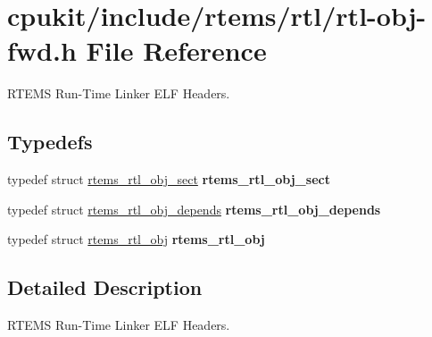 \hypertarget{rtl-obj-fwd_8h}{}\section{cpukit/include/rtems/rtl/rtl-\/obj-\/fwd.h File Reference}
\label{rtl-obj-fwd_8h}


R\+T\+E\+MS Run-\/\+Time Linker E\+LF Headers.  


\subsection*{Typedefs}
\begin{DoxyCompactItemize}
\item 
\mbox{\label{rtl-obj-fwd_8h_a22eec58ce830fd4de56f0a8e27e3bf7e}} 
typedef struct \mbox{\hyperlink{structrtems__rtl__obj__sect}{rtems\+\_\+rtl\+\_\+obj\+\_\+sect}} {\bfseries rtems\+\_\+rtl\+\_\+obj\+\_\+sect}
\item 
\mbox{\label{rtl-obj-fwd_8h_a4e08ba2466b93c09e5d8a94d87acee67}} 
typedef struct \mbox{\hyperlink{structrtems__rtl__obj__depends}{rtems\+\_\+rtl\+\_\+obj\+\_\+depends}} {\bfseries rtems\+\_\+rtl\+\_\+obj\+\_\+depends}
\item 
\mbox{\label{rtl-obj-fwd_8h_a97b620edca286b8d1dc5bb178016f7d5}} 
typedef struct \mbox{\hyperlink{structrtems__rtl__obj}{rtems\+\_\+rtl\+\_\+obj}} {\bfseries rtems\+\_\+rtl\+\_\+obj}
\end{DoxyCompactItemize}


\subsection{Detailed Description}
R\+T\+E\+MS Run-\/\+Time Linker E\+LF Headers. 


